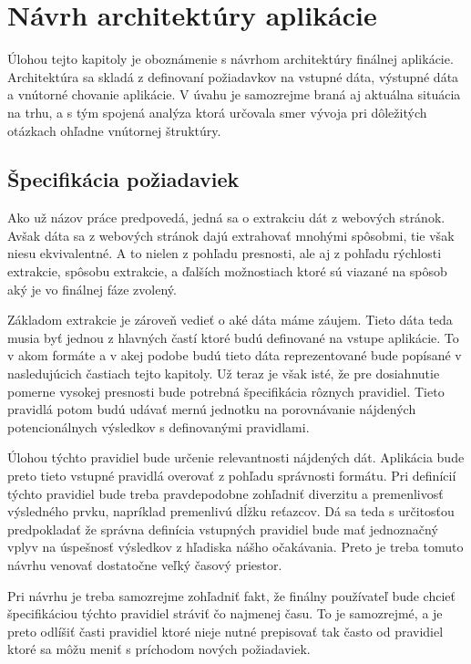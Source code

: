\chapter{Návrh architektúry aplikácie}
\label{Navrh}
Úlohou tejto kapitoly je oboznámenie s návrhom architektúry finálnej aplikácie. Architektúra sa skladá z definovaní požiadavkov na vstupné dáta, výstupné dáta a vnútorné chovanie aplikácie. V úvahu je samozrejme braná aj aktuálna situácia na trhu, a s tým spojená analýza ktorá určovala smer vývoja pri dôležitých otázkach ohľadne vnútornej štruktúry.

\section{Špecifikácia požiadaviek}

Ako už názov práce predpovedá, jedná sa o extrakciu dát z webových stránok. Avšak dáta sa z webových stránok dajú extrahovať mnohými spôsobmi, tie však niesu ekvivalentné. A to nielen z pohľadu presnosti, ale aj z pohľadu rýchlosti extrakcie, spôsobu extrakcie, a ďalších možnostiach ktoré sú viazané na spôsob aký je vo finálnej fáze zvolený.

Základom extrakcie je zároveň vedieť o aké dáta máme záujem. Tieto dáta teda musia byť jednou z hlavných častí ktoré budú definované na vstupe aplikácie. To v akom formáte a v akej podobe budú tieto dáta reprezentované bude popísané v nasledujúcich častiach tejto kapitoly. Už teraz je však isté, že pre dosiahnutie pomerne vysokej presnosti bude potrebná špecifikácia rôznych pravidiel. Tieto pravidlá potom budú udávať mernú jednotku na porovnávanie nájdených potencionálnych výsledkov s definovanými pravidlami.

Úlohou týchto pravidiel bude určenie relevantnosti nájdených dát. Aplikácia bude preto tieto vstupné pravidlá overovať z pohľadu správnosti formátu. Pri definícií týchto pravidiel bude treba pravdepodobne zohľadniť diverzitu a premenlivosť výsledného prvku, napríklad premenlivú dĺžku reťazcov. Dá sa teda s určitosťou predpokladať že správna definícia vstupných pravidiel bude mať jednoznačný vplyv na úspešnosť výsledkov z hľadiska nášho očakávania. Preto je treba tomuto návrhu venovať dostatočne veľký časový priestor.

Pri návrhu je treba samozrejme zohľadniť fakt, že finálny používateľ bude chcieť špecifikáciou týchto pravidiel stráviť čo najmenej času. To je samozrejmé, a je preto odlíšiť časti pravidiel ktoré nieje nutné prepisovať tak často od pravidiel ktoré sa môžu meniť s príchodom nových požiadaviek.

